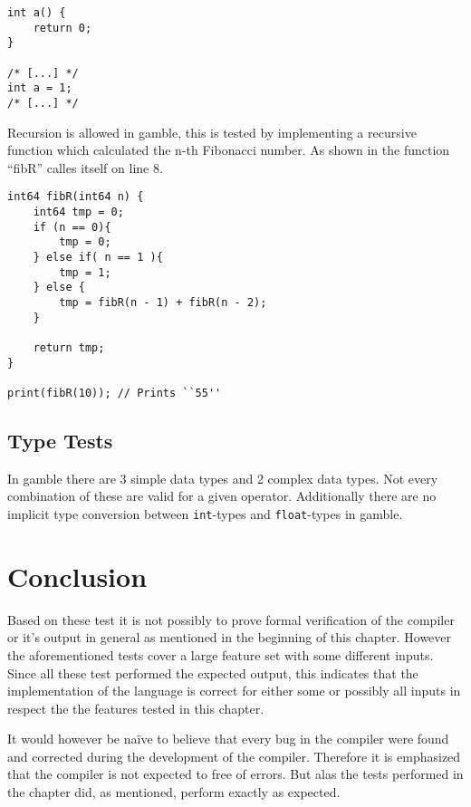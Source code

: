 \begin{lstlisting}[caption={Example of a redeclaration error in \gls{gamble}},label={lst:scope5},frame=tb]
int a() {
    return 0;
}

/* [...] */
int a = 1;
/* [...] */
\end{lstlisting}

Recursion is allowed in \gls{gamble}, this is tested by implementing a recursive function which calculated the n-th Fibonacci number.
As shown in  the function ``fibR'' calles itself on line 8. 

\begin{lstlisting}[caption={Recursive Fibonacci in \gls{gamble}},label={lst:fibR},frame=tb]
int64 fibR(int64 n) {
    int64 tmp = 0;
    if (n == 0){
        tmp = 0;
    } else if( n == 1 ){
        tmp = 1;
    } else {
        tmp = fibR(n - 1) + fibR(n - 2);
    }

    return tmp;
}

print(fibR(10)); // Prints ``55''
\end{lstlisting}

\subsection*{Type Tests}
In \gls{gamble} there are 3 simple data types and 2 complex data types. 
Not every combination of these are valid for a given operator. 
Additionally there are no implicit type conversion between \texttt{int}-types and \texttt{float}-types in \gls{gamble}.

\section{Conclusion}
Based on these test it is not possibly to prove formal verification of the compiler or it's output in general as mentioned in the beginning of this chapter.
However the aforementioned tests cover a large feature set with some different inputs.
Since all these test performed the expected output, this indicates that the implementation of the language is correct for either some or possibly all inputs in respect the the features tested in this chapter.

It would however be naïve to believe that every bug in the compiler were found and corrected during the development of the compiler.%
Therefore it is emphasized that the compiler is not expected to free of errors. %
But alas the tests performed in the chapter did, as mentioned, perform exactly as expected.